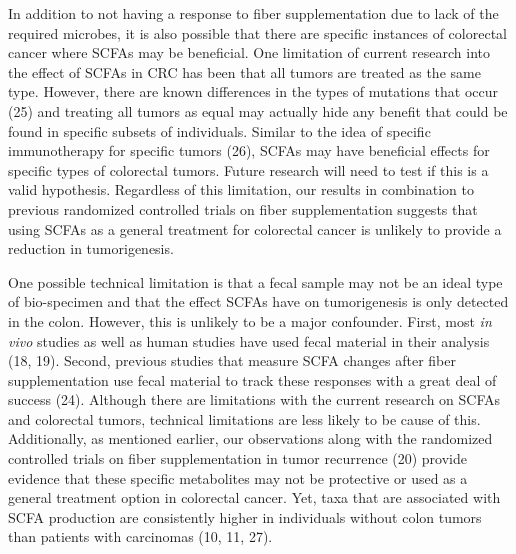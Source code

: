\documentclass[11pt,]{article}
\begin{document}
In addition to not having a response to fiber supplementation due to
lack of the required microbes, it is also possible that there are
specific instances of colorectal cancer where SCFAs may be beneficial.
One limitation of current research into the effect of SCFAs in CRC has
been that all tumors are treated as the same type. However, there are
known differences in the types of mutations that occur (25) and treating
all tumors as equal may actually hide any benefit that could be found in
specific subsets of individuals. Similar to the idea of specific
immunotherapy for specific tumors (26), SCFAs may have beneficial
effects for specific types of colorectal tumors. Future research will
need to test if this is a valid hypothesis. Regardless of this
limitation, our results in combination to previous randomized controlled
trials on fiber supplementation suggests that using SCFAs as a general
treatment for colorectal cancer is unlikely to provide a reduction in
tumorigenesis.

One possible technical limitation is that a fecal sample may not be an
ideal type of bio-specimen and that the effect SCFAs have on
tumorigenesis is only detected in the colon. However, this is unlikely
to be a major confounder. First, most \emph{in vivo} studies as well as
human studies have used fecal material in their analysis (18, 19).
Second, previous studies that measure SCFA changes after fiber
supplementation use fecal material to track these responses with a great
deal of success (24). Although there are limitations with the current
research on SCFAs and colorectal tumors, technical limitations are less
likely to be cause of this. Additionally, as mentioned earlier, our
observations along with the randomized controlled trials on fiber
supplementation in tumor recurrence (20) provide evidence that these
specific metabolites may not be protective or used as a general
treatment option in colorectal cancer. Yet, taxa that are associated
with SCFA production are consistently higher in individuals without
colon tumors than patients with carcinomas (10, 11, 27).
\end{document}
